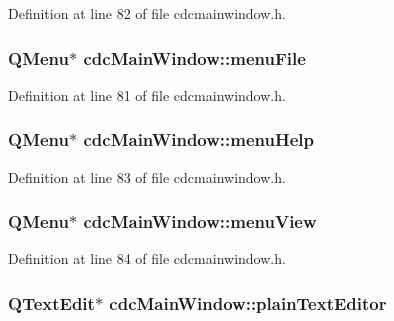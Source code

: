 Definition at line 82 of file cdcmainwindow.\+h.

\hypertarget{classcdc_main_window_a10261cfc57f6d2f7dc8d69c449ded903}{
\subsubsection[{menu\+File}]{\setlength{\rightskip}{0pt plus 5cm}Q\+Menu$\ast$ cdc\+Main\+Window\+::menu\+File\hspace{0.3cm}{\ttfamily [private]}}}\label{classcdc_main_window_a10261cfc57f6d2f7dc8d69c449ded903}


Definition at line 81 of file cdcmainwindow.\+h.

\hypertarget{classcdc_main_window_a8ad1d65233c7c537387d633e73693fb2}{
\subsubsection[{menu\+Help}]{\setlength{\rightskip}{0pt plus 5cm}Q\+Menu$\ast$ cdc\+Main\+Window\+::menu\+Help\hspace{0.3cm}{\ttfamily [private]}}}\label{classcdc_main_window_a8ad1d65233c7c537387d633e73693fb2}


Definition at line 83 of file cdcmainwindow.\+h.

\hypertarget{classcdc_main_window_aff43f7f9a42d9aaa9f468acc48399cc2}{
\subsubsection[{menu\+View}]{\setlength{\rightskip}{0pt plus 5cm}Q\+Menu$\ast$ cdc\+Main\+Window\+::menu\+View\hspace{0.3cm}{\ttfamily [private]}}}\label{classcdc_main_window_aff43f7f9a42d9aaa9f468acc48399cc2}


Definition at line 84 of file cdcmainwindow.\+h.

\hypertarget{classcdc_main_window_ad2f451768cf6b6d2d2e828a0598a7b67}{
\subsubsection[{plain\+Text\+Editor}]{\setlength{\rightskip}{0pt plus 5cm}Q\+Text\+Edit$\ast$ cdc\+Main\+Window\+::plain\+Text\+Editor\hspace{0.3cm}{\ttfamily [private]}}}\label{classcdc_main_window_ad2f451768cf6b6d2d2e828a0598a7b67}


